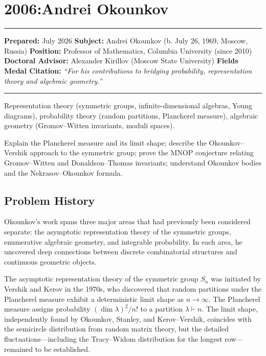\chapter{2006:Andrei Okounkov}\label{ch2006andreiokounkov:andrei-okounkov-fields-medal-2006-a-comprehensive-report-on-his-work-and-impact}

\begin{center}\rule{0.5\linewidth}{0.5pt}\end{center}

\textbf{Prepared:} July 2026 \textbf{Subject:} Andrei Okounkov (b. July 26, 1969, Moscow, Russia) \textbf{Position:} Professor of Mathematics, Columbia University (since 2010) \textbf{Doctoral Advisor:} Alexander Kirillov (Moscow State University) \textbf{Fields Medal Citation:} \emph{``For his contributions to bridging probability, representation theory and algebraic geometry.''}

\begin{center}\rule{0.5\linewidth}{0.5pt}\end{center}

\begin{prereqs} Representation theory (symmetric groups, infinite-dimensional algebras, Young diagrams), probability theory (random partitions, Plancherel measure), algebraic geometry (Gromov--Witten invariants, moduli spaces). \end{prereqs}

\begin{objectives} Explain the Plancherel measure and its limit shape; describe the Okounkov--Vershik approach to the symmetric group; prove the MNOP conjecture relating Gromov--Witten and Donaldson--Thomas invariants; understand Okounkov bodies and the Nekrasov--Okounkov formula. \end{objectives}

\section{Problem History}

Okounkov's work spans three major areas that had previously been considered separate: the asymptotic representation theory of the symmetric groups, enumerative algebraic geometry, and integrable probability. In each area, he uncovered deep connections between discrete combinatorial structures and continuous geometric objects.

The asymptotic representation theory of the symmetric group $S_n$ was initiated by Vershik and Kerov in the 1970s, who discovered that random partitions under the Plancherel measure exhibit a deterministic limit shape as $n \to \infty$. The Plancherel measure assigns probability $(\dim \lambda)^2/n!$ to a partition $\lambda \vdash n$. The limit shape, independently found by Okounkov, Stanley, and Kerov--Vershik, coincides with the semicircle distribution from random matrix theory, but the detailed fluctuations---including the Tracy--Widom distribution for the longest row---remained to be established.

